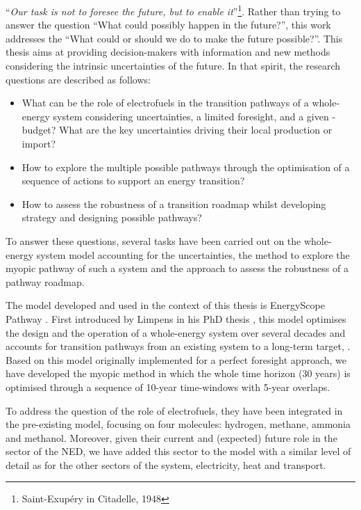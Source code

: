 \noindent
``\textit{Our task is not to foresee the future, but to enable it}''\footnote{Saint-Exupéry in Citadelle, 1948}. Rather than trying to answer the question ``What could possibly happen in the future?'', this work addresses the ``What could or should we do to make the future possible?''. This thesis aims at providing decision-makers with information and new methods considering the intrinsic uncertainties of the future.  In that spirit, the research questions are described as follows:
\begin{itemize}
\item What can be the role of electrofuels in the transition pathways of a whole-energy system considering uncertainties,  a limited foresight, and a given -budget? What are the key uncertainties driving their local production or import?
\item How to explore the multiple possible pathways through the optimisation of a sequence of actions to support an energy transition?
\item How to assess the robustness of a transition roadmap whilst developing strategy and designing possible pathways?
\end{itemize}

To answer these questions, several tasks have been carried out on the whole-energy system model accounting for the uncertainties, the method to explore the myopic pathway of such a system and the approach to assess the robustness of a pathway roadmap. 

The model developed and used in the context of this thesis is EnergyScope Pathway \cite{limpens2024pathway}. First introduced by Limpens in his PhD thesis \cite{limpens2021generating}, this model optimises the design and the operation of a whole-energy system over several decades and accounts for transition pathways from an existing system to a long-term target, . Based on this model originally implemented for a perfect foresight approach, we have developed the myopic method in which the whole time horizon (30 years) is optimised through a sequence of 10-year time-windows with 5-year overlaps.

To address the question of the role of electrofuels, they have been integrated in the pre-existing model, focusing on four molecules: hydrogen, methane, ammonia and methanol. Moreover, given their current and (expected) future role in the sector of the \gls{NED}, we have added this sector to the model with a similar level of detail as for the other sectors of the system, \ie electricity, heat and transport. 


